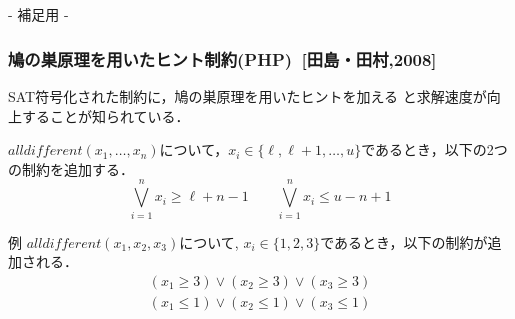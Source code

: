 

\appendix

\backupbegin

\begin{frame}
    \frametitle{~}
    \centering
    - 補足用 -
\end{frame}



\begin{frame}
    \frametitle{鳩の巣原理を用いたヒント制約(PHP)~[田島・田村,2008]}
    SAT符号化された{\alldifferent}制約に，鳩の巣原理を用いたヒントを加える
    と求解速度が向上することが知られている．
    \begin{block}{}
        $alldifferent(x_{1},\ldots,x_{n})$について，$x_i \in
        \{\ell,\ell+1,\ldots,u\}$であるとき，以下の2つの制約を追加する．
        \[
            \bigvee_{i=1}^{n}x_{i}\geq \ell+n-1 \qquad
            \bigvee_{i=1}^{n}x_{i}\leq u-n+1
        \]
    \end{block}
    \begin{exampleblock}{例}
        $alldifferent(x_1, x_2, x_3)$について, $x_i \in \{1,2,3\}$であるとき，以下の制約が追加される．
        \vspace{-3mm}
        \begin{eqnarray*}
            (x_1\geq 3) \lor (x_2 \geq 3) \lor (x_3 \geq 3)\\
            (x_1\leq 1) \lor (x_2 \leq 1) \lor (x_3 \leq 1)
        \end{eqnarray*}
    \end{exampleblock}
\end{frame}


